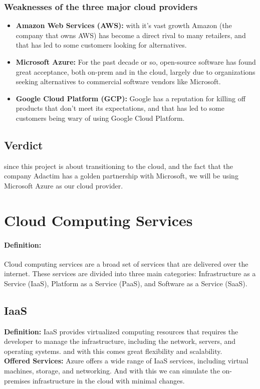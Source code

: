 \subsubsection*{Weaknesses of the three major cloud providers \cite{webArticle1}}
\begin{itemize}
    \item \textbf{Amazon Web Services (AWS):} with it's vast growth Amazon (the company that owns AWS) has become a direct rival to many retailers, and that has led to some customers looking for alternatives.
    \item \textbf{Microsoft Azure:} For the past decade or so, open-source software has found great acceptance, both on-prem and in the cloud, largely due to organizations seeking alternatives to commercial software vendors like Microsoft.
    \item \textbf{Google Cloud Platform (GCP):} Google has a reputation for killing off products that don't meet its expectations, and that has led to some customers being wary of using Google Cloud Platform.
\end{itemize}
\subsection*{Verdict}
since this project is about transitioning to the cloud, and the fact that the company Adactim has a golden partnership with Microsoft, we will be using Microsoft Azure as our cloud provider.


\section{Cloud Computing Services}
\paragraph*{Definition:} Cloud computing services are a broad set of services that are delivered over the internet. These services are divided into three main categories: Infrastructure as a Service (IaaS), Platform as a Service (PaaS), and Software as a Service (SaaS).
\subsection*{IaaS}
\noindent
\textbf{Definition:} IaaS provides virtualized computing resources that requires the developer to manage the infrastructure, including the network, servers, and operating systems. and with this comes great flexibility and scalability.
\noindent \\
\textbf{Offered Services:} Azure offers a wide range of IaaS services, including virtual machines, storage, and networking. And with this we can simulate the on-premises infrastructure in the cloud with minimal changes.
